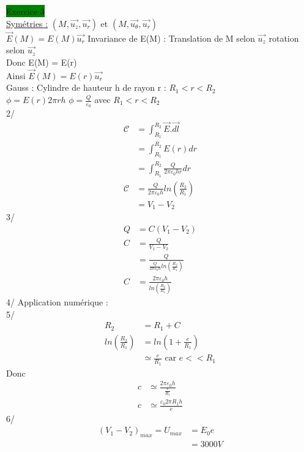 \documentclass[a4paper]{article}
\begin{document}
\noindent \colorbox{green}{Exercice 3}\\
\underline{Symétries :} \((M, \vec{u_z},\vec{u_r})\) et \((M, \vec{u_\theta}, \vec{u_r})\)\\
\(\vec{E}(M) = E(M)\vec{u_r}\)
Invariance de E(M) : Translation de M selon \(\vec{u_z}\) rotation selon \(\vec{u_z}\)\\
Donc E(M) = E(r)\\
Ainsi \(\vec{E}(M) = E(r)\vec{u_r}\)\\
Gauss : Cylindre de hauteur h de rayon r : \(R_1 < r <R_2\)\\
\(\phi = E(r)2\pi r h\) \(\phi = \frac{Q}{\varepsilon_0}\)
 avec \(R_1 < r < R_2\)\\
2/ \begin{align*}
    \mathcal{C} &= \int_{R_1}^{R_2} \vec{E}.\vec{dl}\\
    &= \int_{R_1}^{R_2} E(r)dr\\
    &= \int_{R_1}^{R_2} \frac{Q}{2\pi\varepsilon_0 hr} dr \\
    \mathcal{C} &= \frac{Q}{2\pi \varepsilon_0 h}ln(\frac{R_2}{R_1})\\
    &= V_1 - V_2
\end{align*}
3/ \begin{align*}
    Q &= C(V_1 - V_2)\\
    C &= \frac{Q}{V_1-V_2}\\
    &= \frac{Q}{\frac{Q}{2\pi \varepsilon_0 h}ln(\frac{R_2}{R_1})}\\
    C &= \frac{2\pi \varepsilon_0 h}{ln(\frac{R_2}{R_1})}
\end{align*}
4/ Application numérique : \\
5/ \begin{align*}
    R_2 &= R_1 + C\\
    ln(\frac{R_2}{R_1}) &= ln(1 + \frac{e}{R_1})\\
    &\simeq \frac{e}{R_1} \text{ car } e<<R_1
\end{align*}
Donc \begin{align*}
    c &\simeq \frac{2\pi \varepsilon_0 h}{\frac{e}{R_1}}\\
    c &\simeq \frac{\varepsilon_0 2\pi R_1 h}{e}
\end{align*}
6/ \begin{align*}
    (V_1 - V_2)_{max} = U_{max} &= E_0 e\\
    &= 3000V
\end{align*}\\
\end{document}
